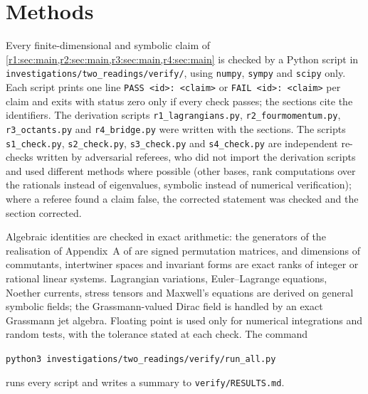 \section{Methods}
\label{r9:sec:main}

Every finite-dimensional and symbolic claim of \cref{r1:sec:main,r2:sec:main,r3:sec:main,r4:sec:main} is checked by a Python script
in \texttt{investigations/two\_readings/verify/}, using \texttt{numpy}, \texttt{sympy} and \texttt{scipy} only. Each script prints one line
\texttt{PASS <id>: <claim>} or \texttt{FAIL <id>: <claim>} per claim and exits with status zero only if every check passes; the sections
cite the identifiers. The derivation scripts \texttt{r1\_lagrangians.py}, \texttt{r2\_fourmomentum.py}, \texttt{r3\_octants.py} and
\texttt{r4\_bridge.py} were written with the sections. The scripts \texttt{s1\_check.py}, \texttt{s2\_check.py}, \texttt{s3\_check.py} and \texttt{s4\_check.py}
are independent re-checks written by adversarial referees, who did not import the derivation scripts and used different methods where
possible (other bases, rank computations over the rationals instead of eigenvalues, symbolic instead of numerical verification); where a
referee found a claim false, the corrected statement was checked and the section corrected.

Algebraic identities are checked in exact arithmetic: the generators of the realisation of Appendix~A of \cite{ES17} are signed
permutation matrices, and dimensions of commutants, intertwiner spaces and invariant forms are exact ranks of integer or rational linear
systems. Lagrangian variations, Euler--Lagrange equations, Noether currents, stress tensors and Maxwell's equations are derived on general
symbolic fields; the Grassmann-valued Dirac field is handled by an exact Grassmann jet algebra. Floating point is used only for numerical
integrations and random tests, with the tolerance stated at each check. The command
\begin{center}
\texttt{python3 investigations/two\_readings/verify/run\_all.py}
\end{center}
runs every script and writes a summary to \texttt{verify/RESULTS.md}.

